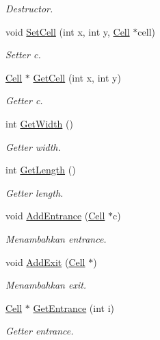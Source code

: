 \begin{DoxyCompactItemize}
\begin{DoxyCompactList}\small\item\em Destructor. \end{DoxyCompactList}\item 
void \hyperlink{classZoo_abbbc7f6dbbdd2bcf0d7ea130ff7b75ff}{Set\+Cell} (int x, int y, \hyperlink{classCell}{Cell} $\ast$cell)
\begin{DoxyCompactList}\small\item\em Setter c. \end{DoxyCompactList}\item 
\hyperlink{classCell}{Cell} $\ast$ \hyperlink{classZoo_aa49be948dec5b0a2132e09822d7ff053}{Get\+Cell} (int x, int y)
\begin{DoxyCompactList}\small\item\em Getter c. \end{DoxyCompactList}\item 
int \hyperlink{classZoo_a7c64c9bc4156508f76c378e327c1d310}{Get\+Width} ()
\begin{DoxyCompactList}\small\item\em Getter width. \end{DoxyCompactList}\item 
int \hyperlink{classZoo_af5daa12c3652abde6bcd3401d6b115ff}{Get\+Length} ()
\begin{DoxyCompactList}\small\item\em Getter length. \end{DoxyCompactList}\item 
void \hyperlink{classZoo_a4d9bd50e85f2db05953a2c0f1c28e544}{Add\+Entrance} (\hyperlink{classCell}{Cell} $\ast$c)
\begin{DoxyCompactList}\small\item\em Menambahkan entrance. \end{DoxyCompactList}\item 
void \hyperlink{classZoo_a71fb3e80888204c2268e2eea7cebe155}{Add\+Exit} (\hyperlink{classCell}{Cell} $\ast$)
\begin{DoxyCompactList}\small\item\em Menambahkan exit. \end{DoxyCompactList}\item 
\hyperlink{classCell}{Cell} $\ast$ \hyperlink{classZoo_a6abb30edd3c25b445b7ae1fb614e70d4}{Get\+Entrance} (int i)
\begin{DoxyCompactList}\small\item\em Getter entrance. \end{DoxyCompactList}\item 

\end{DoxyCompactItemize}
